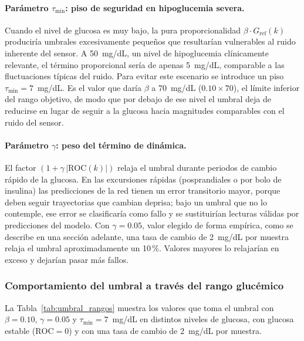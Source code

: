 \documentclass{report}
\begin{document}
\paragraph{Parámetro $\tau_{\min}$: piso de seguridad en hipoglucemia severa.} Cuando el nivel de glucosa es muy bajo, la pura proporcionalidad $\beta \cdot G_{\mathrm{ref}}(k)$ produciría umbrales excesivamente pequeños que resultarían vulnerables al ruido inherente del sensor. A 50~mg/dL, un nivel de hipoglucemia clínicamente relevante, el término proporcional sería de apenas 5~mg/dL, comparable a las fluctuaciones típicas del ruido. Para evitar este escenario se introduce un piso $\tau_{\min} = 7$~mg/dL. Es el valor que daría $\beta$ a 70~mg/dL ($0.10 \times 70$), el límite inferior del rango objetivo, de modo que por debajo de ese nivel el umbral deja de reducirse en lugar de seguir a la glucosa hacia magnitudes comparables con el ruido del sensor.

\paragraph{Parámetro $\gamma$: peso del término de dinámica.} El factor $(1 + \gamma\,|\mathrm{ROC}(k)|)$ relaja el umbral durante periodos de cambio rápido de la glucosa. En las excursiones rápidas (posprandiales o por bolo de insulina) las predicciones de la red tienen un error transitorio mayor, porque deben seguir trayectorias que cambian deprisa; bajo un umbral que no lo contemple, ese error se clasificaría como fallo y se sustituirían lecturas válidas por predicciones del modelo. Con $\gamma = 0.05$, valor elegido de forma empírica, como se describe en una sección adelante, una tasa de cambio de 2~mg/dL por muestra relaja el umbral aproximadamente un 10\,\%. Valores mayores lo relajarían en exceso y dejarían pasar más fallos.

\subsubsection{Comportamiento del umbral a través del rango glucémico}
\label{subsec:comportamiento_umbral}

La Tabla~\ref{tab:umbral_rangos} muestra los valores que toma el umbral con $\beta = 0.10$, $\gamma = 0.05$ y $\tau_{\min} = 7$~mg/dL en distintos niveles de glucosa, con glucosa estable ($\mathrm{ROC} = 0$) y con una tasa de cambio de 2~mg/dL por muestra.
\end{document}
